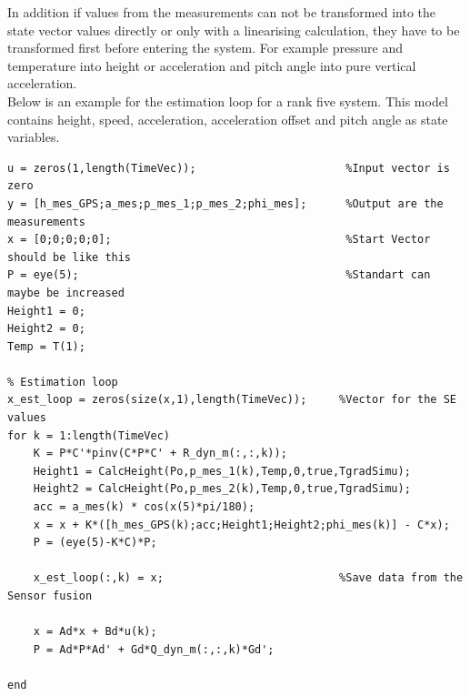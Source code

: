 In addition if values from the measurements can not be transformed into the state vector values directly or only with a linearising calculation,
they have to be transformed first before entering the system.
For example pressure and temperature into height or acceleration and pitch angle into pure vertical acceleration.\\

Below is an example for the estimation loop for a rank five system. This model contains height, speed, acceleration, acceleration offset and pitch angle as state variables.
\begin{lstlisting}[caption={State Estimation Loop}]
% Initalzation
u = zeros(1,length(TimeVec));                       %Input vector is zero
y = [h_mes_GPS;a_mes;p_mes_1;p_mes_2;phi_mes];      %Output are the measurements
x = [0;0;0;0;0];                                    %Start Vector should be like this
P = eye(5);                                         %Standart can maybe be increased
Height1 = 0;
Height2 = 0;
Temp = T(1);

% Estimation loop
x_est_loop = zeros(size(x,1),length(TimeVec));     %Vector for the SE values
for k = 1:length(TimeVec)
    K = P*C'*pinv(C*P*C' + R_dyn_m(:,:,k));
    Height1 = CalcHeight(Po,p_mes_1(k),Temp,0,true,TgradSimu);
    Height2 = CalcHeight(Po,p_mes_2(k),Temp,0,true,TgradSimu);
    acc = a_mes(k) * cos(x(5)*pi/180);
    x = x + K*([h_mes_GPS(k);acc;Height1;Height2;phi_mes(k)] - C*x);
    P = (eye(5)-K*C)*P;

    x_est_loop(:,k) = x;                           %Save data from the Sensor fusion

    x = Ad*x + Bd*u(k);
    P = Ad*P*Ad' + Gd*Q_dyn_m(:,:,k)*Gd';

end
\end{lstlisting}

